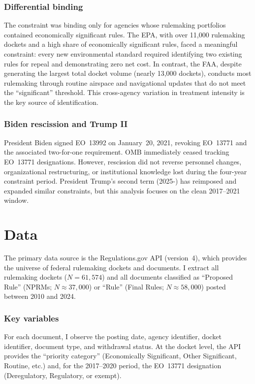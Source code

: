 \documentclass[12pt]{article}
\begin{document}
\subsubsection*{Differential binding} The constraint was binding only for agencies whose rulemaking portfolios contained economically significant rules. The EPA, with over 11,000 rulemaking dockets and a high share of economically significant rules, faced a meaningful constraint: every new environmental standard required identifying two existing rules for repeal and demonstrating zero net cost. In contrast, the FAA, despite generating the largest total docket volume (nearly 13,000 dockets), conducts most rulemaking through routine airspace and navigational updates that do not meet the ``significant'' threshold. This cross-agency variation in treatment intensity is the key source of identification.

\subsubsection*{Biden rescission and Trump II} President Biden signed EO~13992 on January~20, 2021, revoking EO~13771 and the associated two-for-one requirement. OMB immediately ceased tracking EO~13771 designations. However, rescission did not reverse personnel changes, organizational restructuring, or institutional knowledge lost during the four-year constraint period. President Trump's second term (2025-) has reimposed and expanded similar constraints, but this analysis focuses on the clean 2017--2021 window.

\section{Data}
\label{sec:data}

The primary data source is the Regulations.gov API (version~4), which provides the universe of federal rulemaking dockets and documents. I extract all rulemaking dockets ($N = 61{,}574$) and all documents classified as ``Proposed Rule'' (NPRMs; $N \approx 37{,}000$) or ``Rule'' (Final Rules; $N \approx 58{,}000$) posted between 2010 and 2024.

\subsubsection*{Key variables} For each document, I observe the posting date, agency identifier, docket identifier, document type, and withdrawal status. At the docket level, the API provides the ``priority category'' (Economically Significant, Other Significant, Routine, etc.) and, for the 2017--2020 period, the EO~13771 designation (Deregulatory, Regulatory, or exempt).
\end{document}

